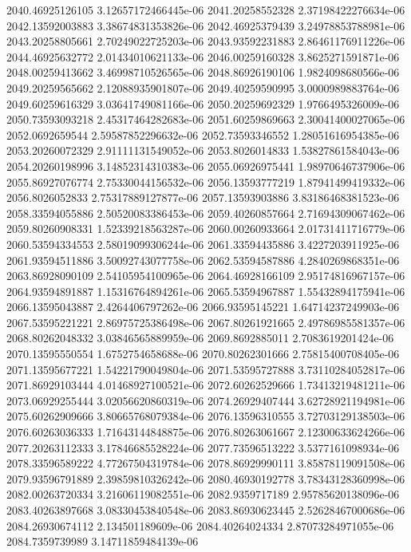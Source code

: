 {2040.46925126105 3.12657172466445e-06
2041.20258552328 2.37198422276634e-06
2042.13592003883 3.38674831353826e-06
2042.46925379439 3.24978853788981e-06
2043.20258805661 2.70249022725203e-06
2043.93592231883 2.86461176911226e-06
2044.46925632772 2.01434010621133e-06
2046.00259160328 3.8625271591871e-06
2048.00259413662 3.46998710526565e-06
2048.86926190106 1.9824098680566e-06
2049.20259565662 2.12088935901807e-06
2049.40259590995 3.0000989883764e-06
2049.60259616329 3.03641749081166e-06
2050.20259692329 1.9766495326009e-06
2050.73593093218 2.45317464282683e-06
2051.60259869663 2.30041400027065e-06
2052.0692659544 2.59587852296632e-06
2052.73593346552 1.28051616954385e-06
2053.20260072329 2.91111131549052e-06
2053.8026014833 1.53827861584043e-06
2054.20260198996 3.14852314310383e-06
2055.06926975441 1.98970646737906e-06
2055.86927076774 2.75330044156532e-06
2056.13593777219 1.87941499419332e-06
2056.8026052833 2.75317889127877e-06
2057.13593903886 3.83186468381523e-06
2058.33594055886 2.50520083386453e-06
2059.40260857664 2.71694309067462e-06
2059.80260908331 1.52339218563287e-06
2060.00260933664 2.01731411716779e-06
2060.53594334553 2.58019099306244e-06
2061.33594435886 3.4227203911925e-06
2061.93594511886 3.50092743077758e-06
2062.53594587886 4.2840269868351e-06
2063.86928090109 2.54105954100965e-06
2064.46928166109 2.95174816967157e-06
2064.93594891887 1.15316764894261e-06
2065.53594967887 1.55432894175941e-06
2066.13595043887 2.4264406797262e-06
2066.93595145221 1.64714237249903e-06
2067.53595221221 2.86975725386498e-06
2067.80261921665 2.49786985581357e-06
2068.80262048332 3.03846565889959e-06
2069.8692885011 2.7083619201424e-06
2070.13595550554 1.6752754658688e-06
2070.80262301666 2.75815400708405e-06
2071.13595677221 1.54221790049804e-06
2071.53595727888 3.73110284052817e-06
2071.86929103444 4.01468927100521e-06
2072.60262529666 1.73413219481211e-06
2073.06929255444 3.02056620860319e-06
2074.26929407444 3.62728921194981e-06
2075.60262909666 3.80665768079384e-06
2076.13596310555 3.72703129138503e-06
2076.60263036333 1.71643144848875e-06
2076.80263061667 2.12300633624266e-06
2077.20263112333 3.17846685528224e-06
2077.73596513222 3.5377161098934e-06
2078.33596589222 4.77267504319784e-06
2078.86929990111 3.85878119091508e-06
2079.93596791889 2.39859810326242e-06
2080.46930192778 3.78343128360998e-06
2082.00263720334 3.21606119082551e-06
2082.9359717189 2.95785620138096e-06
2083.40263897668 3.08330453840548e-06
2083.86930623445 2.52628467000686e-06
2084.26930674112 2.134501189609e-06
2084.40264024334 2.87073284971055e-06
2084.7359739989 3.14711859484139e-06
}
